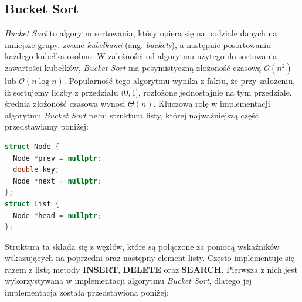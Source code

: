 \documentclass{article}
\newcommand{\bigO}{\mathcal{O}}
\begin{document}
\subsection{Bucket Sort}
\textit{Bucket Sort} to algorytm sortowania, który opiera się na podziale danych na mniejsze grupy, zwane \textit{kubełkami} (ang. \textit{buckets}), a następnie posortowaniu każdego kubełka osobno. W zależności od algorytmu użytego do sortowania zawartości kubełków, \textit{Bucket Sort} ma pesymistyczną złożoność czasową $\bigO(n^2)$ lub $\bigO(n \log n)$. Popularność tego algorytmu wynika z faktu, że przy założeniu, iż sortujemy liczby z przedziału $(0, 1]$, rozłożone jednostajnie na tym przedziale, średnia złożoność czasowa wynosi $\Theta(n)$. Kluczową rolę w implementacji algorytmu \textit{Bucket Sort} pełni struktura listy, której najważniejszą część przedstawiamy poniżej:
\begin{lstlisting}[style=mystyle, language=C++, caption={Implementacja \texttt{Listy}}, label={lst:list}]
struct Node {
  Node *prev = nullptr;
  double key;
  Node *next = nullptr;
};
struct List {
  Node *head = nullptr;
};
\end{lstlisting}
Struktura ta składa się z węzłów, które są połączone za pomocą wskaźników wskazujących na poprzedni oraz następny element listy. Często implementuje się razem z listą metody \textbf{INSERT}, \textbf{DELETE} oraz \textbf{SEARCH}. Pierwsza z nich jest wykorzystywana w implementacji algorytmu \textit{Bucket Sort}, dlatego jej implementacja została przedstawiona poniżej:
\end{document}
